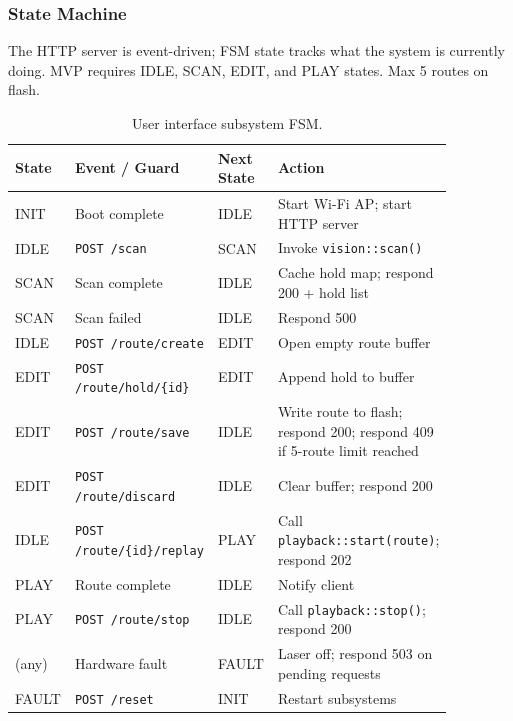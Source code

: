 \documentclass[12pt]{extarticle}
\begin{document}
\subsubsection{State Machine}

The HTTP server is event-driven; FSM state tracks what the system is currently doing.
MVP requires IDLE, SCAN, EDIT, and PLAY states. Max 5 routes on flash.

\begin{table}[H]
\small\centering
\begin{tabular}{>{\raggedright}p{0.13\linewidth}
                >{\raggedright}p{0.28\linewidth}
                >{\raggedright}p{0.13\linewidth}
                >{\raggedright\arraybackslash}p{0.33\linewidth}}
\toprule
\textbf{State} & \textbf{Event / Guard} & \textbf{Next State} & \textbf{Action} \\
\midrule
INIT  & Boot complete                      & IDLE  & Start Wi-Fi AP; start HTTP server \\
IDLE  & \texttt{POST /scan}                & SCAN  & Invoke \texttt{vision::scan()} \\
SCAN  & Scan complete                      & IDLE  & Cache hold map; respond 200 + hold list \\
SCAN  & Scan failed                        & IDLE  & Respond 500 \\
IDLE  & \texttt{POST /route/create}        & EDIT  & Open empty route buffer \\
EDIT  & \texttt{POST /route/hold/\{id\}}   & EDIT  & Append hold to buffer \\
EDIT  & \texttt{POST /route/save}          & IDLE  & Write route to flash; respond 200; respond 409 if 5-route limit reached \\
EDIT  & \texttt{POST /route/discard}       & IDLE  & Clear buffer; respond 200 \\
IDLE  & \texttt{POST /route/\{id\}/replay} & PLAY  & Call \texttt{playback::start(route)}; respond 202 \\
PLAY  & Route complete                     & IDLE  & Notify client \\
PLAY  & \texttt{POST /route/stop}          & IDLE  & Call \texttt{playback::stop()}; respond 200 \\
(any) & Hardware fault                     & FAULT & Laser off; respond 503 on pending requests \\
FAULT & \texttt{POST /reset}               & INIT  & Restart subsystems \\
\bottomrule
\end{tabular}
\caption{User interface subsystem FSM.}
\label{tab:fsm-ui}
\end{table}
\end{document}
